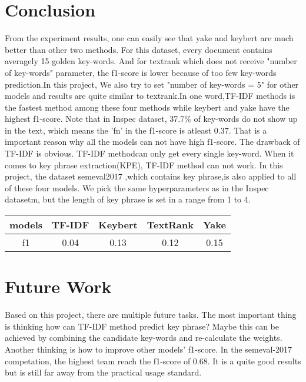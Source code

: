 \documentclass[11pt,a4paper]{article}
\begin{document}
\section{Conclusion}
From the experiment results, one can easily see that yake and keybert are much better than other two methods. For this 
dataset, every document contains averagely 15 golden key-words. And for textrank which does not receive "number of key-words" parameter,
the f1-score is lower because of too few key-words prediction.In this project, We also try to set "number of key-words = 5" for other
models and results are quite similar to textrank.In one word,TF-IDF methods is the fastest method among these four methods while keybert and yake have the highest f1-score.
\vspace{11pt}
\noindent
Note that in Inspec dataset, 37.7$\%$ of key-words do not show up in the text, which means the 'fn' in the f1-score is atleast
0.37. That is a important reason why all the models can not have high f1-score.
\vspace{11pt}
\noindent
The drawback of TF-IDF is obvious. TF-IDF methodcan only get every single key-word. When it comes
to key phrase extraction(KPE), TF-IDF method can not work. In this project, the dataset semeval2017 \cite{augenstein-etal-2017-semeval} 
,which contains key phrase,is also applied to all of these four models. We pick the same hyperparameters as in the Inspec datasetm, but the length
of key phrase is set in a range from 1 to 4.
\vspace{11pt}
\begin{center}
    \begin{tabular}{ccccc}
        \hline
        models& TF-IDF& Keybert& TextRank& Yake\\
        \hline
        f1& 0.04& 0.13& 0.12& 0.15 \\
        \hline
    \end{tabular}
\end{center}
\noindent

\section{Future Work}
Based on this project, there are multiple future tasks. The most important thing is thinking how can
TF-IDF method predict key phrase? Maybe this can be achieved by combining the candidate key-words and re-calculate
the weights. Another thinking is how to improve other models' f1-score.
\vspace{11pt}
\noindent
In the semeval-2017 competation, the highest team reach the f1-score of 0.68. It is a quite good results but is still
far away from the practical usage standard.
\end{document}
